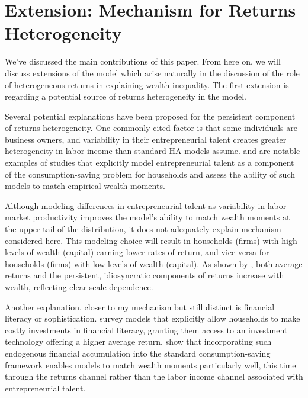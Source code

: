 \onlyinsubfile{\setcounter{section}{5}}
\section{Extension: Mechanism for Returns Heterogeneity}
\notinsubfile{\label{sec:Mechanism}}

\par We've discussed the main contributions of this paper. From here on, we will discuss extensions of the model which arise naturally in the discussion of the role of heterogeneous returns in explaining wealth inequality. The first extension is regarding a potential source of returns heterogeneity in the model. 

\par Several potential explanations have been proposed for the persistent component of returns heterogeneity. One commonly cited factor is that some individuals are business owners, and variability in their entrepreneurial talent creates greater heterogeneity in labor income than standard HA models assume. \cite{Cagetti2006} and \cite{Cagetti2009} are notable examples of studies that explicitly model entrepreneurial talent as a component of the consumption-saving problem for households and assess the ability of such models to match empirical wealth moments.

\par Although modeling differences in entrepreneurial talent as variability in labor market productivity improves the model's ability to match wealth moments at the upper tail of the distribution, it does not adequately explain mechanism considered here. This modeling choice will result in households (firms) with high levels of wealth (capital) earning lower rates of return, and vice versa for households (firms) with low levels of wealth (capital). As shown by \cite{aflgdmlp20}, both average returns and the persistent, idiosyncratic components of returns increase with wealth, reflecting clear scale dependence. 

\par Another  explanation, closer to my mechanism but still distinct is financial literacy or sophistication. \cite{Lusardi2014} survey models that explicitly allow households to make costly investments in financial literacy, granting them access to an investment technology offering a higher average return. \cite{Lusardi2017} show that incorporating such endogenous financial accumulation into the standard consumption-saving framework enables models to match wealth moments particularly well, this time through the returns channel rather than the labor income channel associated with entrepreneurial talent.

